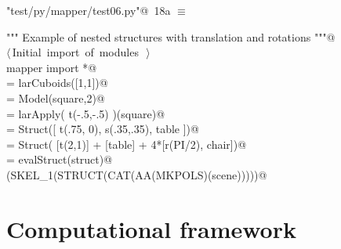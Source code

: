 \documentclass[11pt,oneside]{article}	%
\begin{document}
\begin{flushleft} \small \label{scrap33}
\protect{}\verb@"test/py/mapper/test06.py"@\nobreak\ {\footnotesize 18a }$\equiv$
\vspace{-1ex}
\begin{list}{}{} \item
\mbox{}\verb@""" Example of nested structures with translation and rotations """@\\
\mbox{}\verb@@\hbox{$\langle\,$Initial import of modules\nobreak\ {\footnotesize {}}$\,\rangle$}\verb@@\\
\mbox{}\verb@from mapper import *@\\
\mbox{}\verb@square = larCuboids([1,1])@\\
\mbox{}\verb@square = Model(square,2)@\\
\mbox{}\verb@table = larApply( t(-.5,-.5) )(square)@\\
\mbox{}\verb@chair = Struct([ t(.75, 0), s(.35,.35), table ])@\\
\mbox{}\verb@struct = Struct( [t(2,1)] + [table] + 4*[r(PI/2), chair])@\\
\mbox{}\verb@scene = evalStruct(struct)@\\
\mbox{}\verb@VIEW(SKEL_1(STRUCT(CAT(AA(MKPOLS)(scene)))))@\\
\mbox{}\verb@@{\NWsep}
\end{list}
\vspace{-2ex}
\end{flushleft}

\section{Computational framework}
\end{document}

